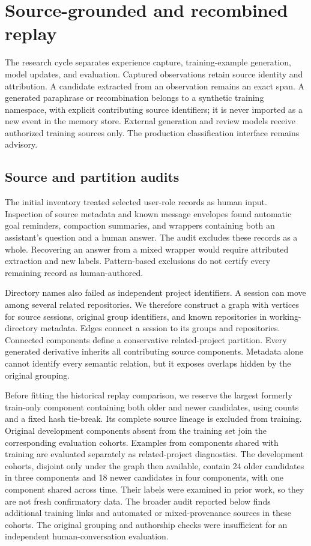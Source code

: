 \section{Source-grounded and recombined replay}
\label{sec:replay}
The research cycle separates experience capture, training-example generation, model updates, and evaluation. Captured observations retain source identity and attribution. A candidate extracted from an observation remains an exact span. A generated paraphrase or recombination belongs to a synthetic training namespace, with explicit contributing source identifiers; it is never imported as a new event in the memory store. External generation and review models receive authorized training sources only. The production classification interface remains advisory.

\subsection{Source and partition audits}
The initial inventory treated selected user-role records as human input. Inspection of source metadata and known message envelopes found automatic goal reminders, compaction summaries, and wrappers containing both an assistant's question and a human answer. The audit excludes these records as a whole. Recovering an answer from a mixed wrapper would require attributed extraction and new labels. Pattern-based exclusions do not certify every remaining record as human-authored.

Directory names also failed as independent project identifiers. A session can move among several related repositories. We therefore construct a graph with vertices for source sessions, original group identifiers, and known repositories in working-directory metadata. Edges connect a session to its groups and repositories. Connected components define a conservative related-project partition. Every generated derivative inherits all contributing source components. Metadata alone cannot identify every semantic relation, but it exposes overlaps hidden by the original grouping.

Before fitting the historical replay comparison, we reserve the largest formerly train-only component containing both older and newer candidates, using counts and a fixed hash tie-break. Its complete source lineage is excluded from training. Original development components absent from the training set join the corresponding evaluation cohorts. Examples from components shared with training are evaluated separately as related-project diagnostics. The development cohorts, disjoint only under the graph then available, contain 24 older candidates in three components and 18 newer candidates in four components, with one component shared across time. Their labels were examined in prior work, so they are not fresh confirmatory data. The broader audit reported below finds additional training links and automated or mixed-provenance sources in these cohorts. The original grouping and authorship checks were insufficient for an independent human-conversation evaluation.

